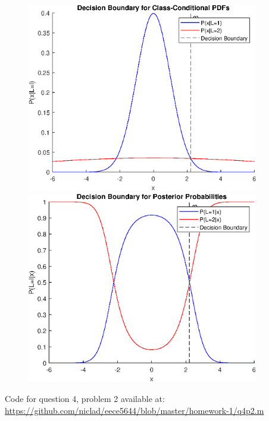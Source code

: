\documentclass[12pt,A4]{article}
\begin{document}
\begin{enumerate}
    \begin{figure}[h]
    \centering
    \begin{minipage}{0.5\textwidth}
        \centering
        \includegraphics[width=0.9\textwidth]{plot1.eps} %
    \end{minipage}\hfill
    \begin{minipage}{0.5\textwidth}
        \centering
        \includegraphics[width=0.9\textwidth]{plot2.eps} %
    \end{minipage}
\end{figure}

\begin{center}
    Code for question 4, problem 2 available at: \url{https://github.com/niclad/eece5644/blob/master/homework-1/q4p2.m}
\end{center}


\end{enumerate}
\end{document}

